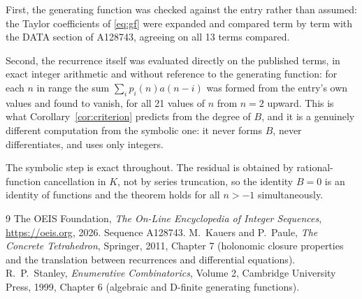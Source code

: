 \documentclass[11pt,a4paper]{article}
\theoremstyle{plain}
\theoremstyle{definition}
\begin{document}
First, the generating function was checked against the entry rather than assumed: the
Taylor coefficients of \eqref{eq:gf} were expanded and compared term by term with the DATA
section of A128743, agreeing on all 13 terms compared.

Second, the recurrence itself was evaluated directly on the published terms, in exact
integer arithmetic and without reference to the generating function: for each $n$ in range
the sum $\sum_{i}p_{i}(n)a(n-i)$ was formed from the entry's own values and found to
vanish, for all 21 values of $n$ from $n=2$ upward. This is what
Corollary~\ref{cor:criterion} predicts from the degree of $B$, and it is a genuinely
different computation from the symbolic one: it never forms $B$, never differentiates, and
uses only integers.

The symbolic step is exact throughout. The residual is obtained by rational-function
cancellation in $K$, not by series truncation, so the identity $B=0$ is an
identity of functions and the theorem holds for all $n>-1$ simultaneously.

\begin{thebibliography}{9}
 The OEIS Foundation, \emph{The On-Line Encyclopedia of Integer Sequences},
\url{https://oeis.org}, 2026. Sequence A128743.
 M.~Kauers and P.~Paule, \emph{The Concrete Tetrahedron}, Springer, 2011,
Chapter 7 (holonomic closure properties and the translation between recurrences and
differential equations).
 R.~P.~Stanley, \emph{Enumerative Combinatorics}, Volume 2, Cambridge
University Press, 1999, Chapter 6 (algebraic and D-finite generating functions).
\end{thebibliography}
\end{document}
